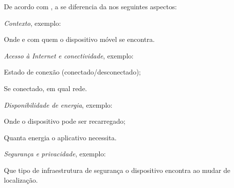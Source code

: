 De acordo com , a \iomt se diferencia da \iot nos seguintes aspectos:
\begin{alineas}

	\item \emph{Contexto}, exemplo:
		
		\begin{alineas}

			\item Onde e com quem o dispositivo móvel se encontra.

		\end{alineas}

	\item \emph{Acesso à Internet e conectividade}, exemplo:
		
		\begin{alineas}

			\item Estado de conexão (conectado/desconectado);
				
			\item Se conectado, em qual rede.

		\end{alineas}

	\item \emph{Disponibilidade de energia}, exemplo:
		
		\begin{alineas}

			\item Onde o dispositivo pode ser recarregado;
				
			\item Quanta energia o aplicativo necessita.

		\end{alineas}

	\item \emph{Segurança e privacidade}, exemplo:
		
		\begin{alineas}

			\item Que tipo de infraestrutura de segurança o dispositivo encontra ao mudar de localização.

		\end{alineas}

\end{alineas}


\subsection{\mhubcddl}

